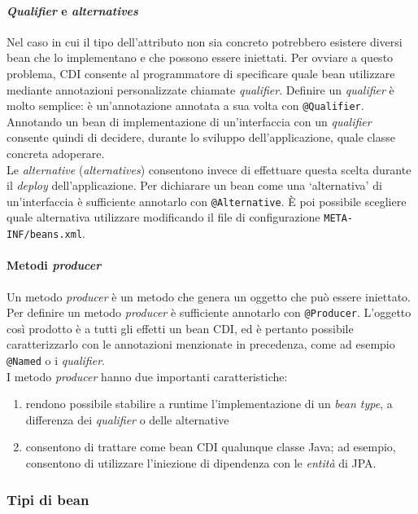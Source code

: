 \paragraph{\textit{Qualifier} e \textit{alternatives}} Nel caso in cui il tipo dell'attributo non sia concreto potrebbero esistere diversi bean che lo implementano e che possono essere iniettati. Per ovviare a questo problema, CDI consente al programmatore di specificare quale bean utilizzare mediante annotazioni personalizzate chiamate \textit{qualifier}. Definire un \textit{qualifier} è molto semplice: è un'annotazione annotata a sua volta con \lstinline{@Qualifier}. Annotando un bean di implementazione di un'interfaccia con un \textit{qualifier} consente quindi di decidere, durante lo sviluppo dell'applicazione, quale classe concreta adoperare.\\
Le \textsl{alternative} (\textit{alternatives}) consentono invece di effettuare questa scelta durante il \textit{deploy} dell'applicazione. Per dichiarare un bean come una \textquoteleft alternativa\textquoteright{} di un'interfaccia è sufficiente annotarlo con \lstinline{@Alternative}. È poi possibile scegliere quale alternativa utilizzare modificando il file di configurazione \texttt{META-INF/beans.xml}.

\paragraph{Metodi \textit{producer}} Un metodo \textit{producer} è un metodo che genera un oggetto che può essere iniettato. Per definire un metodo \textit{producer} è sufficiente annotarlo con \lstinline{@Producer}. L'oggetto così prodotto è a tutti gli effetti un bean CDI, ed è pertanto possibile caratterizzarlo con le annotazioni menzionate in precedenza, come ad esempio \lstinline{@Named} o i \textit{qualifier}.\\
I metodo \textit{producer} hanno due importanti caratteristiche:
\begin{enumerate}
\item rendono possibile stabilire a runtime l'implementazione di un \textit{bean type}, a differenza dei \textit{qualifier} o delle alternative
\item consentono di trattare come bean CDI qualunque classe Java; ad esempio, consentono di utilizzare l'iniezione di dipendenza con le \textsl{entità} di JPA.
\end{enumerate}


\subsubsection{Tipi di bean}

